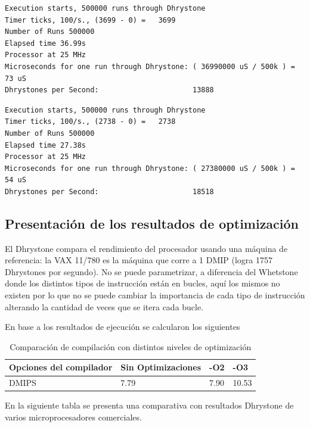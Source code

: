 \begin{lstlisting}[frame=single,caption={Optimización nivel -O2},label={lst:salidas},breaklines]
Execution starts, 500000 runs through Dhrystone
Timer ticks, 100/s., (3699 - 0) =	3699
Number of Runs 500000
Elapsed time 36.99s
Processor at 25 MHz
Microseconds for one run through Dhrystone: ( 36990000 uS / 500k ) = 73 uS
Dhrystones per Second:                      13888 
\end{lstlisting}

\begin{lstlisting}[frame=single,caption={Optimización nivel -O3},label={lst:salidas},breaklines]
Execution starts, 500000 runs through Dhrystone
Timer ticks, 100/s., (2738 - 0) =	2738
Number of Runs 500000
Elapsed time 27.38s
Processor at 25 MHz
Microseconds for one run through Dhrystone: ( 27380000 uS / 500k ) = 54 uS
Dhrystones per Second:                      18518 
\end{lstlisting}


	\subsection {Presentación de los resultados de optimización} 

El Dhrystone compara el rendimiento del procesador usando una máquina de referencia: la VAX 11/780 es la máquina que corre a 1 DMIP (logra 1757
Dhrystones por segundo). No se puede parametrizar, a diferencia del Whetstone donde los distintos tipos de instrucción están en bucles, aquí los
mismos no existen por lo que no se puede cambiar la importancia de cada tipo de instrucción alterando la cantidad de veces que se itera cada bucle.

En base a los resultados de ejecución se calcularon los siguientes 

\begin{table}[h!]
\begin{center}
\begin{tabular}{ |l |l |l |l |}
\hline
\rowcolor[gray]{0.8} Opciones del compilador& Sin Optimizaciones & -O2 &-O3 \\
\hline
DMIPS 					& 7.79 			&   7.90  &  10.53  \\
\hline
\end{tabular}
\end{center}
\caption{Comparación de compilación con distintos niveles de optimización}
\end{table}


En la siguiente tabla se presenta una comparativa con resultados Dhrystone de varios microprocesadores comerciales.

